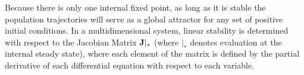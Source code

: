 \documentclass[12pt,english]{article}
\begin{document}
\begin{spacing}{1.9}
\noindent Because there is only one internal fixed point, as long as it is stable the population trajectories will serve as a global attractor for any set of positive initial conditions.
In a multidimensional system, linear stability is determined with respect to the Jacobian Matrix $\bf J|_*$ (where $|_*$ denotes evaluation at the internal steady state), where each element of the matrix is defined by the partial derivative of each differential equation with respect to each variable.
%



\end{spacing}
\end{document}
